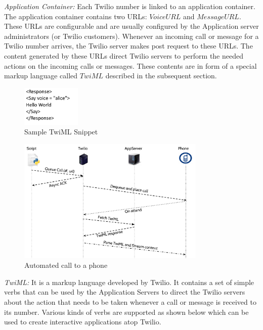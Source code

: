 \emph{Application Container: } Each Twilio number is linked to an application container. The application container contains two URLs: $Voice URL$ and $Message URL$. These URLs are configurable and are usually configured by the Application server administrators (or Twilio customers). Whenever an incoming call or message for a Twilio number arrives, the Twilio server makes post request to these URLs. The content generated by these URLs direct Twilio servers to perform the needed actions on the incoming calls or messages. These contents are in form of a special markup language called $TwiML$ described in the subsequent section.
 \begin{figure}
 \centering
   \includegraphics[width=0.25\textwidth]{figs/TwiML.png}
 \caption{Sample TwiML Snippet}
 \label{fig:TwilML}
 \end{figure} 
\begin{figure}[t!] 
\centering
  \includegraphics[width=0.8\textwidth]{figs/auto.pdf}
\caption{Automated call to a phone}
\label{fig:autocall}
\end{figure} 
\emph{TwiML:  } It is a markup language developed by Twilio. It contains a set of simple verbs that can be used by the Application Servers to direct the Twilio servers about the action that needs to be taken whenever a call or message is received to its number. Various kinds of verbs are supported as shown below which can be used to create interactive applications atop Twilio.

